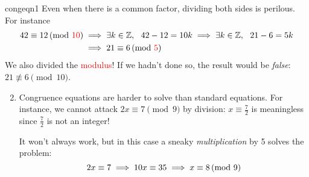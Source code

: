 \begin{examples}{}{congeqn1}
	\exstart Even when there is a common factor, dividing both sides is perilous. For instance
	\begin{align*}
		42\equiv 12\negthickspace\pmod{\textcolor{red}{10}}&\implies \exists k\in\mathbb{Z},\ \ 42-12=10k \implies \exists k\in\mathbb{Z},\ \ 21-6=5k\\
		&\implies 21\equiv 6\negthickspace\pmod{\textcolor{red}{5}}
	\end{align*}
	We also divided the \textcolor{red}{modulus}! If we hadn't done so, the result would be \emph{false}: $21\not\equiv 6\pmod{10}$.
			
	\begin{enumerate}\setcounter{enumi}{1}
		\item Congruence equations are harder to solve than standard equations. For instance, we cannot attack $2x\equiv 7\pmod 9$ by division: $x\equiv \frac 72$ is meaningless since $\frac 72$ is not an integer!\par
		It won't always work, but in this case a sneaky \emph{multiplication} by 5 solves the problem:
		\[
			2x\equiv 7\implies 10x\equiv 35\implies x\equiv 8\negthickspace\pmod{9}
		\]
	\end{enumerate}
\end{examples}


\vfil

